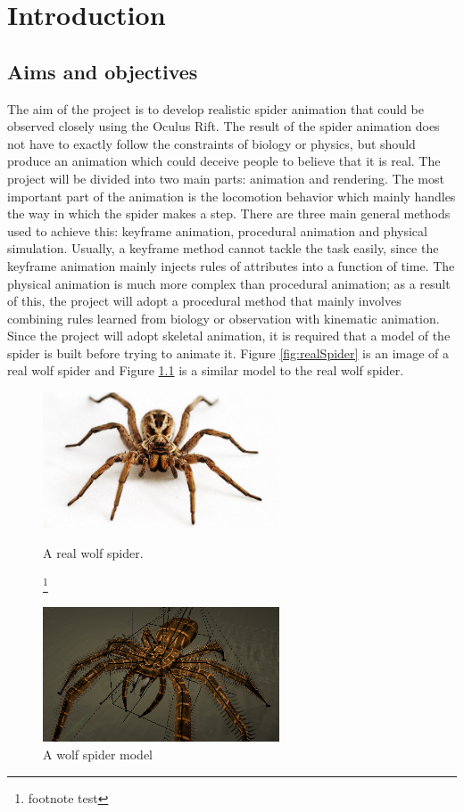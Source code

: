 \chapter{Introduction}
\section{Aims and objectives}
The aim of the project is to develop realistic spider animation that could be observed closely using the Oculus Rift. The result of the spider animation does not have to exactly follow the constraints of biology or physics, but should produce an animation which could deceive people to believe that it is real. 
The project will be divided into two main parts: animation and rendering. 
The most important part of the animation is the locomotion behavior which mainly handles the way in which the spider makes a step. 
There are three main general methods used to achieve this: keyframe animation, procedural animation and physical simulation. Usually, a keyframe method cannot tackle the task easily, since the keyframe animation mainly injects rules of attributes into a function of time. The physical animation is much more complex than procedural animation; as a result of this, the project will adopt a procedural method that mainly involves combining rules learned from biology or observation with kinematic animation.  
Since the project will adopt skeletal animation, it is required that a model of the spider is built before trying to animate it. Figure  \ref{fig:realSpider} is an image of a real wolf spider and Figure \ref{fig:spiderModel} is a similar model to the real wolf spider.
\begin{figure}[ht!]
\centering
\begin{minipage}[b]{0.45\linewidth}
\includegraphics[width=7cm]{figures/realSpider.png}
\caption{A real wolf spider. \protect\cite{realSpider}}
\footnote{footnote test}
\label{fig:realSpider}
\end{minipage}
\quad
\begin{minipage}[b]{0.45\linewidth}
\includegraphics[width=7cm]{figures/spiderModel.png}
\caption{A wolf spider model \protect\cite{spiderModel}}
\label{fig:spiderModel}
\end{minipage}
\end{figure}
